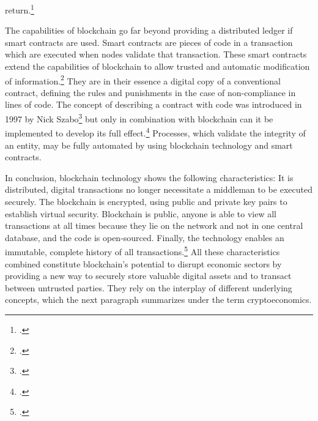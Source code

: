 return.\footcites[Cf.][p.12]{CataliniSimpleEconomicsBlockchain2017}[cf.][p.5 et seqq]{DavidsonEconomicsBlockchain2016}   



The capabilities of blockchain go far beyond providing a distributed ledger if smart contracts are used. Smart contracts are pieces of code in a transaction which are executed when nodes validate that transaction. These smart contracts extend the capabilities of blockchain to allow trusted and automatic modification of information.\footcite[Cf.][p.14]{Schutte.2017} They are in their essence a digital copy of a conventional contract, defining the rules and punishments in the case of non-compliance in lines of code. The concept of describing a contract with code was introduced in 1997 by Nick Szabo\footcite[][]{Szabo.1997} but only in combination with blockchain can it be implemented to develop its full effect.\footcites[Cf.][p.23]{Schlatt.2016}[cf.][p.22-24]{GOV.2016} Processes, which validate the integrity of an entity, may be fully automated by using blockchain technology and smart contracts.

In conclusion, blockchain technology shows the following characteristics: It is distributed, digital transactions no longer necessitate a middleman to be executed securely. The blockchain is encrypted, using public and private key pairs to establish virtual security. Blockchain is public, anyone is able to view all transactions at all times because they lie on the network and not in one central database, and the code is open-sourced. Finally, the technology enables an immutable, complete history of all transactions.\footcite[Cf.][p.5]{Tapscott.2017} All these characteristics combined constitute blockchain's potential to disrupt economic sectors by providing a new way to securely store valuable digital assets and to transact between untrusted parties. They rely on the interplay of different underlying concepts, which the next paragraph summarizes under the term cryptoeconomics.

